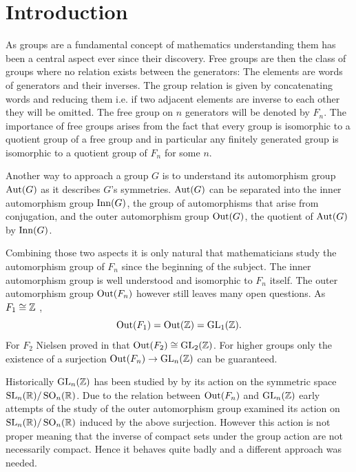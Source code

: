 %

\usepackage{todonotes}
\usepackage{./tikzit/tikzit}
\usepackage{biblatex}


\usepackage[stable]{footmisc}
\usepackage{caption}
\usepackage{subcaption}

	

\newpage
\section{Introduction}
As groups are a fundamental concept of mathematics understanding them has been a central aspect ever since their discovery.
Free groups are then the class of groups where no relation exists between the generators: 
The elements are words of generators and their inverses. The group relation is given by concatenating words
and reducing them i.e. if two adjacent elements are inverse to each other they will be omitted.
The free group on $n$ generators will be denoted by $F_{n}$.
The importance of free groups arises from the fact that every group is isomorphic to a quotient group of a free group
and in particular any finitely generated group is isomorphic to a quotient group of $F_{n}$ for some $n$.

Another way to approach a group $G$ is to understand its automorphism group $\operatorname{Aut}(G)$ as it describes $G$'s symmetries.
$\operatorname{Aut}(G)$ can be separated into the inner automorphism group $\operatorname{Inn}(G)$,
the group of automorphisms that arise from conjugation, and the outer automorphism group $\operatorname{Out}(G)$, the quotient of  $\operatorname{Aut}(G)$ by $\operatorname{Inn}(G)$.

Combining those two aspects it is only natural that mathematicians study the automorphism group of $F_{n}$ since the beginning of the subject.
The inner automorphism group is well understood and isomorphic to $F_{n}$ itself.
The outer automorphism group $\operatorname{Out}(F_{n})$ however still leaves many open questions.
As $F_{1} \cong \mathbb{Z}$ ,
\[
	\operatorname{Out}(F_1) = \operatorname{Out}(\mathbb{Z}) = \operatorname{GL}_{1}(\mathbb{Z})
.\] 
For $F_{2}$ Nielsen proved in \cite{nielsen17} that $\operatorname{Out}(F_2) \cong \operatorname{GL}_{2}(\mathbb{Z})$.
For higher groups only the existence of a surjection $\operatorname{Out}(F_{n}) \to \operatorname{GL}_{n}(\mathbb{Z})$ can be guaranteed.

Historically $\operatorname{GL}_{n}(\mathbb{Z})$ has been studied by by its action on the symmetric space $\operatorname{SL}_{n}(\mathbb{R}) / \operatorname{SO}_{n}(\mathbb{R})$.
Due to the relation between $\operatorname{Out}(F_{n})$ and $\operatorname{GL}_{n}(\mathbb{Z})$ early attempts of the study of the outer automorphism group
examined its action on $\operatorname{SL}_{n}(\mathbb{R}) / \operatorname{SO}_{n}(\mathbb{R})$ induced by the above surjection.
However this action is not proper meaning that the inverse of compact sets under the group action are not necessarily compact.
Hence it behaves quite badly and a different approach was needed.

